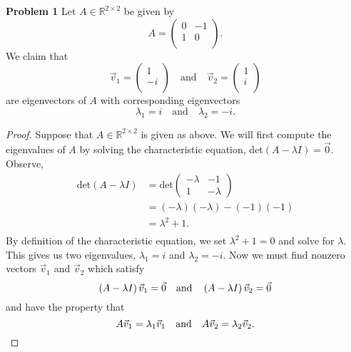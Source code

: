 \documentclass{article}
\begin{document}
\textbf{Problem 1}
Let $A \in \mathbb{R}^{2 \times 2}$ be given by $$A = \begin{pmatrix} 
0 & -1\\
1 & 0\\
\end{pmatrix}.$$ We claim that 
$$\vec{v}_1 = \begin{pmatrix} 
1\\
-i\\
\end{pmatrix} \quad \text{and} \quad \vec{v}_2 = \begin{pmatrix} 
1\\
i\\
\end{pmatrix}$$ are eigenvectors of $A$ with corresponding eigenvectors $$\lambda_1 = i \quad \text{and} \quad \lambda_2 = -i.$$
\begin{proof}
Suppose that $A \in \mathbb{R}^{2\times2}$ is given as above. We will first compute the eigenvalues of $A$ by solving the characteristic equation, det$\left( A - \lambda I \right) = \vec{0}.$ Observe,
\begin{align*}
\text{det}\left( A - \lambda I \right) &= \text{det}\begin{pmatrix}-\lambda&-1\\1&-\lambda\end{pmatrix}\\
&= \left(-\lambda\right)\left(-\lambda\right) - \left(-1\right)\left(-1\right)\\
&= \lambda^2 +1.\\
\end{align*}
By definition of the characteristic equation, we set $\lambda^2 + 1 = 0$ and solve for $\lambda$. This gives us two eigenvalues, $\lambda_1 = i$ and $\lambda_2 = -i$. Now we must find nonzero vectors $\vec{v}_1$ and $\vec{v}_2$ which satisfy
\begin{equation}\label{eq1}
\left( A - \lambda I \right)\vec{v}_1 = \vec{0} \quad \text{and} \quad \left( A - \lambda I \right)\vec{v}_2 = \vec{0}\\
\end{equation}
and have the property that
\begin{equation}\label{eq2}
A\vec{v}_1 = \lambda_1 \vec{v}_1 \quad \text{and} \quad A\vec{v}_2 = \lambda_2 \vec{v}_2.\\
\end{equation}


\end{proof}
\end{document}
